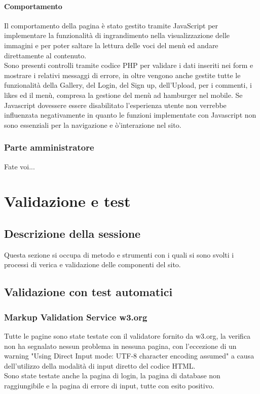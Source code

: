 \documentclass[openany, a4paper, 12pt]{report}
\begin{document}
			\subsubsection{Comportamento}
			Il comportamento della pagina è stato gestito tramite JavaScript per implementare la funzionalità di ingrandimento nella visualizzazione delle immagini e per poter saltare la lettura delle voci del menù ed andare direttamente al contenuto.\\
			Sono presenti controlli tramite codice PHP per validare i dati inseriti nei form e mostrare i relativi messaggi di errore, in oltre vengono anche gestite tutte le funzionalità della Gallery, del Login, del Sign up, dell'Upload, per i commenti, i likes ed il menù, compresa la gestione del menù ad hamburger nel mobile. Se Javascript dovessere essere disabilitato l'esperienza utente non verrebbe influenzata negativamente in quanto le funzioni implementate con Javascript non sono essenziali per la navigazione e ò'interazione nel sito.

	\subsection{Parte amministratore}
		Fate voi...

	\chapter{Validazione e test}
		\section{Descrizione della sessione}
			Questa sezione si occupa di metodo e strumenti con i quali si sono svolti i processi di verica e validazione delle componenti del sito.
		\section{Validazione con test automatici}
			\subsection{Markup Validation Service w3.org}
				Tutte le pagine sono state testate con il validatore fornito da w3.org, la verifica non ha segnalato nessun problema in nessuna pagina, con l'eccezione di un warning "Using Direct Input mode: UTF-8 character encoding assumed" a causa dell'utilizzo della modalità di input diretto del codice HTML.\\
				Sono state testate anche la pagina di login, la pagina di database non raggiungibile e la pagina di errore di input, tutte con esito positivo.
\end{document}
